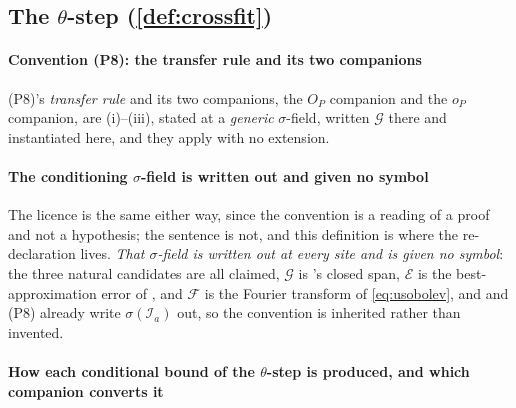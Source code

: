\subsection*{The $\theta$-step (\cref{def:crossfit})}

\paragraph{Convention \textup{(P8)}: the transfer rule and its two companions}

\textup{(P8)}'s \emph{transfer rule} and
its two companions, the $O_P$ companion and the $o_P$ companion, are (i)--(iii),
stated at a \emph{generic} $\sigma$-field, written $\mathcal G$ there and instantiated here, and they apply
with no extension.

\paragraph{The conditioning $\sigma$-field is written out and given no symbol}

The licence is the same
either way, since the convention is a reading of a proof and not a hypothesis; the sentence is not, and this
definition is where the re-declaration lives. \emph{That $\sigma$-field is written out at every site and is
given no symbol}: the
three natural candidates are all claimed, $\mathcal G$ is 's closed span,
$\mathcal E$ is the best-approximation error of , and $\mathcal F$ is the Fourier
transform of \eqref{eq:usobolev}, and  and \textup{(P8)} already write
$\sigma(\mathcal I_a)$ out, so the convention is inherited rather than invented.

\paragraph{How each conditional bound of the $\theta$-step is produced, and which companion converts it}

